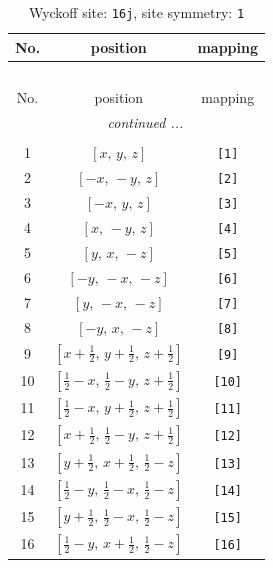 \documentclass[fleqn,8pt]{jsarticle}
\begin{document}
\begin{longtable}{ccc}
\caption{Wyckoff site: {\tt 16j}, site symmetry: {\tt 1}}
 \\
 \hline \hline
No. & position & mapping \\ \hline \endfirsthead

\multicolumn{2}{l}{\tablename\ \thetable{}} \\
 \hline \hline
No. & position & mapping \\ \hline \endhead

 \hline \hline
\multicolumn{2}{r}{\footnotesize\it continued ...} \\ \endfoot

 \hline \hline
\multicolumn{2}{r}{} \\ \endlastfoot

1 & $\left[ x,\, y,\, z \right]$ & {\tt [1]} \\ \hline
2 & $\left[ - x,\, - y,\, z \right]$ & {\tt [2]} \\ \hline
3 & $\left[ - x,\, y,\, z \right]$ & {\tt [3]} \\ \hline
4 & $\left[ x,\, - y,\, z \right]$ & {\tt [4]} \\ \hline
5 & $\left[ y,\, x,\, - z \right]$ & {\tt [5]} \\ \hline
6 & $\left[ - y,\, - x,\, - z \right]$ & {\tt [6]} \\ \hline
7 & $\left[ y,\, - x,\, - z \right]$ & {\tt [7]} \\ \hline
8 & $\left[ - y,\, x,\, - z \right]$ & {\tt [8]} \\ \hline
9 & $\left[ x + \frac{1}{2},\, y + \frac{1}{2},\, z + \frac{1}{2} \right]$ & {\tt [9]} \\ \hline
10 & $\left[ \frac{1}{2} - x,\, \frac{1}{2} - y,\, z + \frac{1}{2} \right]$ & {\tt [10]} \\ \hline
11 & $\left[ \frac{1}{2} - x,\, y + \frac{1}{2},\, z + \frac{1}{2} \right]$ & {\tt [11]} \\ \hline
12 & $\left[ x + \frac{1}{2},\, \frac{1}{2} - y,\, z + \frac{1}{2} \right]$ & {\tt [12]} \\ \hline
13 & $\left[ y + \frac{1}{2},\, x + \frac{1}{2},\, \frac{1}{2} - z \right]$ & {\tt [13]} \\ \hline
14 & $\left[ \frac{1}{2} - y,\, \frac{1}{2} - x,\, \frac{1}{2} - z \right]$ & {\tt [14]} \\ \hline
15 & $\left[ y + \frac{1}{2},\, \frac{1}{2} - x,\, \frac{1}{2} - z \right]$ & {\tt [15]} \\ \hline
16 & $\left[ \frac{1}{2} - y,\, x + \frac{1}{2},\, \frac{1}{2} - z \right]$ & {\tt [16]} \\
\end{longtable}
\end{document}
